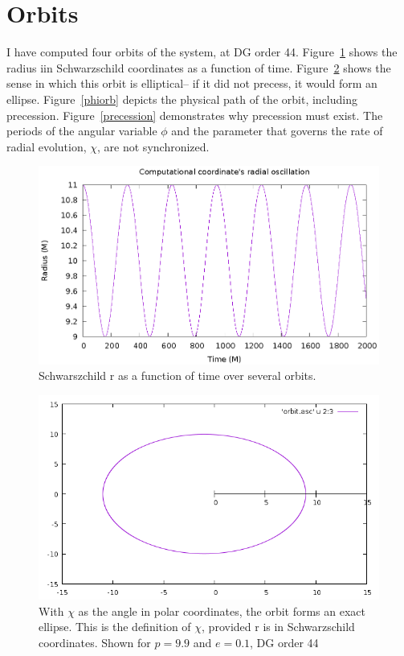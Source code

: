 \section{Orbits}

I have computed four orbits of the system, at DG order 44. Figure~\ref{rorb} shows the radius iin Schwarzschild coordinates as a function of time. Figure~\ref{chiorb} shows the sense in which this orbit is elliptical-- if it did not precess, it would form an ellipse. Figure~\ref{phiorb} depicts the physical path of the orbit, including precession. Figure~\ref{precession} demonstrates why precession must exist. The periods of the angular variable $\phi$ and the parameter that governs the rate of radial evolution, $\chi$, are not synchronized.

\begin{figure}
  \includegraphics{orbit}
  \caption{Schwarszchild r as a function of time over several orbits.}
  \label{rorb}
\end{figure}


\begin{figure}
  \includegraphics{orbitdg44p99e01}
  \caption{With $\chi$ as the angle in polar coordinates, the orbit forms an exact ellipse. This is the definition of $\chi$, provided r is in Schwarzschild coordinates. Shown for $p=9.9$ and $e=0.1$, DG order 44}
  \label{chiorb}
\end{figure}

